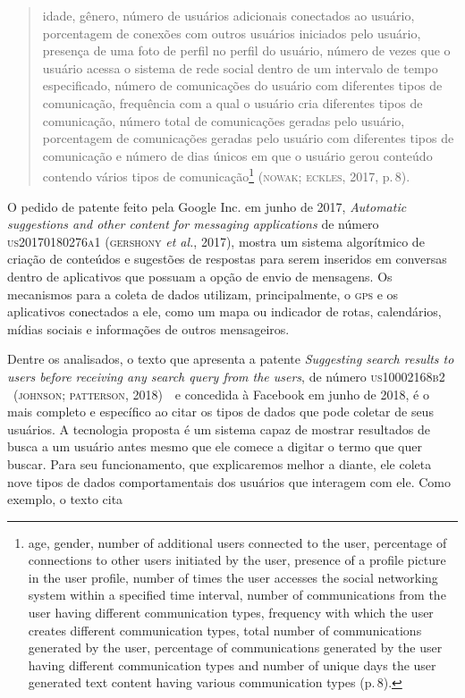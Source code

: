 \begin{quote}
idade, gênero, número de usuários adicionais conectados ao usuário,
porcentagem de conexões com outros usuários iniciados pelo usuário,
presença de uma foto de perfil no perfil do usuário, número de vezes que
o usuário acessa o sistema de rede social dentro de um intervalo de
tempo especificado, número de comunicações do usuário com diferentes
tipos de comunicação, frequência com a qual o usuário cria diferentes
tipos de comunicação, número total de comunicações geradas pelo usuário,
porcentagem de comunicações geradas pelo usuário com diferentes tipos de
comunicação e número de dias únicos em que o usuário gerou conteúdo
contendo vários tipos de comunicação\footnote{age, gender, number of
  additional users connected to the user, percentage of connections to
  other users initiated by the user, presence of a profile picture in
  the user profile, number of times the user accesses the social
  networking system within a specified time interval, number of
  communications from the user having different communication types,
  frequency with which the user creates different communication types,
  total number of communications generated by the user, percentage of
  communications generated by the user having different communication
  types and number of unique days the user generated text content having
  various communication types (p.\,8).} (\textsc{nowak}; \textsc{eckles}, 2017, p.\,8).
\end{quote}

O pedido de patente feito pela Google Inc. em junho de 2017,
\emph{Automatic suggestions and other content for messaging
applications} de número \textsc{us20170180276a1} (\textsc{gershony} \emph{et al.}, 2017),
mostra um sistema algorítmico de criação de conteúdos e sugestões de
respostas para serem inseridos em conversas dentro de aplicativos que
possuam a opção de envio de mensagens. Os mecanismos para a coleta de
dados utilizam, principalmente, o \textsc{gps} e os aplicativos conectados a ele,
como um mapa ou indicador de rotas, calendários, mídias sociais e
informações de outros mensageiros.

Dentre os analisados, o texto que apresenta a patente \emph{Suggesting
search results to users before receiving any search query from the
users}, de número \textsc{us10002168b2} ~(\textsc{johnson; patterson}, 2018)~~e concedida
à Facebook em junho de 2018, é o mais completo e específico ao citar os
tipos de dados que pode coletar de seus usuários. A tecnologia proposta
é um sistema capaz de mostrar resultados de busca a um usuário antes
mesmo que ele comece a digitar o termo que quer buscar. Para seu
funcionamento, que explicaremos melhor a diante, ele coleta nove tipos
de dados comportamentais dos usuários que interagem com ele. Como
exemplo, o texto cita

